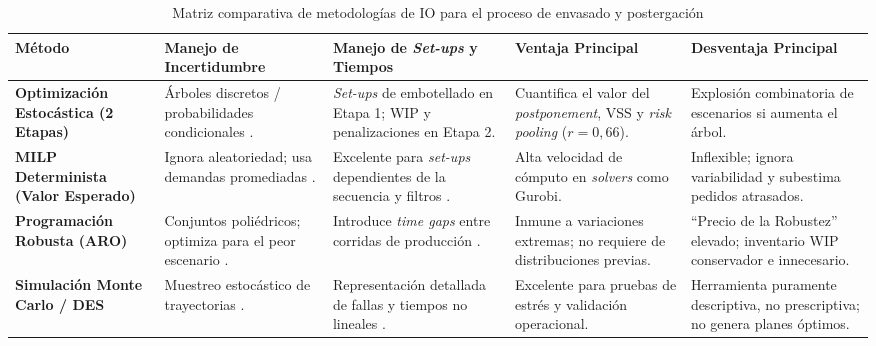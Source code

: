 \begin{table}[H]
  \centering
  \caption{Matriz comparativa de metodologías de IO para el proceso de envasado y postergación}
  \label{tab:comparativa_metodologias}

  \small
  \setlength{\tabcolsep}{3pt} %
  \begin{tabular*}{\textwidth}{@{\extracolsep{\fill}}
    >{\raggedright\arraybackslash}p{} 
    >{\raggedright\arraybackslash}p{} 
    >{\raggedright\arraybackslash}p{} 
    >{\raggedright\arraybackslash}p{} 
    >{\raggedright\arraybackslash}p{}}
    \toprule
    \textbf{Método} & \textbf{Manejo de Incertidumbre} & \textbf{Manejo de \textit{Set-ups} y Tiempos} & \textbf{Ventaja Principal} & \textbf{Desventaja Principal} \\
    \midrule

    \textbf{Optimización Estocástica (2 Etapas)} & Árboles discretos / probabilidades condicionales \cite{gupta2000two}. & \textit{Set-ups} de embotellado en Etapa 1; WIP y penalizaciones en Etapa 2. & Cuantifica el valor del \textit{postponement}, VSS y \textit{risk pooling} ($r = 0{,}66$). & Explosión combinatoria de escenarios si aumenta el árbol. \\
    \addlinespace[0.5em]

    \textbf{MILP Determinista (Valor Esperado)} & Ignora aleatoriedad; usa demandas promediadas \cite{gunther2014block}. & Excelente para \textit{set-ups} dependientes de la secuencia y filtros \cite{lillo2025optimal}. & Alta velocidad de cómputo en \textit{solvers} como Gurobi. & Inflexible; ignora variabilidad y subestima pedidos atrasados. \\
    \addlinespace[0.5em]

    \textbf{Programación Robusta (ARO)} & Conjuntos poliédricos; optimiza para el peor escenario \cite{hu2020hybrid}. & Introduce \textit{time gaps} entre corridas de producción \cite{lappas2016multi}. & Inmune a variaciones extremas; no requiere de distribuciones previas. & ``Precio de la Robustez'' elevado; inventario WIP conservador e innecesario. \\
    \addlinespace[0.5em]

    \textbf{Simulación Monte Carlo / DES} & Muestreo estocástico de trayectorias \cite{review2024simula}. & Representación detallada de fallas y tiempos no lineales \cite{jeon2016survey}. & Excelente para pruebas de estrés y validación operacional. & Herramienta puramente descriptiva, no prescriptiva; no genera planes óptimos. \\
    \bottomrule
  \end{tabular*}
\end{table}

